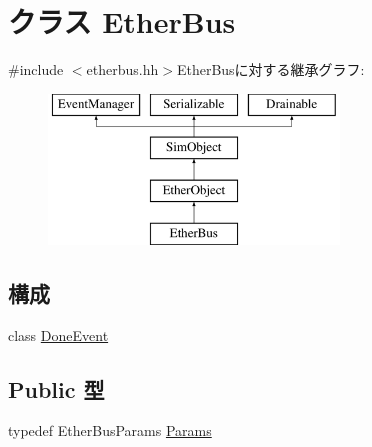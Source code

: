 \hypertarget{classEtherBus}{
\section{クラス EtherBus}
\label{classEtherBus}
}


{\ttfamily \#include $<$etherbus.hh$>$}EtherBusに対する継承グラフ:\begin{figure}[H]
\begin{center}
\leavevmode
\includegraphics[height=4cm]{classEtherBus}
\end{center}
\end{figure}
\subsection*{構成}
\begin{DoxyCompactItemize}
\item 
class \hyperlink{classEtherBus_1_1DoneEvent}{DoneEvent}
\end{DoxyCompactItemize}
\subsection*{Public 型}
\begin{DoxyCompactItemize}
\item 
typedef EtherBusParams \hyperlink{classEtherBus_af0984f6bd7717c1679765dfdacae4ddd}{Params}
\end{DoxyCompactItemize}
